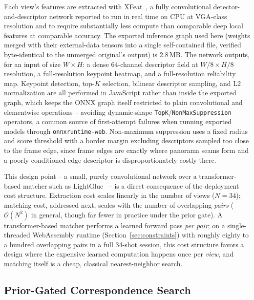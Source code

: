 \documentclass[11pt]{article}
\begin{document}
Each view's features are extracted with XFeat~\cite{potje2024xfeat}, a fully convolutional detector-and-descriptor network reported to run in real time on CPU at VGA-class resolution and to require substantially less compute than comparable deep local features at comparable accuracy. The exported inference graph used here (weights merged with their external-data tensors into a single self-contained file, verified byte-identical to the unmerged original's output) is 2.8\,MB. The network outputs, for an input of size $W\times H$: a dense $64$-channel descriptor field at $W/8 \times H/8$ resolution, a full-resolution keypoint heatmap, and a full-resolution reliability map. Keypoint detection, top-$K$ selection, bilinear descriptor sampling, and L2 normalization are all performed in JavaScript rather than inside the exported graph, which keeps the ONNX graph itself restricted to plain convolutional and elementwise operations -- avoiding dynamic-shape \texttt{TopK}/\texttt{NonMaxSuppression} operators, a common source of first-attempt failures when running exported models through \texttt{onnxruntime-web}. Non-maximum suppression uses a fixed radius and score threshold with a border margin excluding descriptors sampled too close to the frame edge, since frame edges are exactly where panorama seams form and a poorly-conditioned edge descriptor is disproportionately costly there.

This design point -- a small, purely convolutional network over a transformer-based matcher such as LightGlue~\cite{lindenberger2023lightglue} -- is a direct consequence of the deployment cost structure. Extraction cost scales linearly in the number of views ($N=34$); matching cost, addressed next, scales with the number of overlapping \emph{pairs} ($\mathcal{O}(N^2)$ in general, though far fewer in practice under the prior gate). A transformer-based matcher performs a learned forward pass \emph{per pair}; on a single-threaded WebAssembly runtime (Section~\ref{sec:constraints}) with roughly eighty to a hundred overlapping pairs in a full 34-shot session, this cost structure favors a design where the expensive learned computation happens once per \emph{view}, and matching itself is a cheap, classical nearest-neighbor search.

\subsection{Prior-Gated Correspondence Search}
\label{sec:matching}
\end{document}
